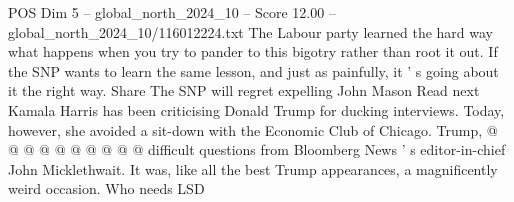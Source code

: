 \begin{textsample}{POS Dim 5 – global\_north\_2024\_10 – Score 12.00 – global\_north\_2024\_10/116012224.txt}
The Labour party learned the hard way what happens when you try to pander to this bigotry rather than root it out.
If the SNP wants to learn the same lesson, and just as painfully, it ' s going about it the right way.
Share The SNP will regret expelling John Mason Read next Kamala Harris has been criticising Donald Trump for ducking interviews.
Today, however, she avoided a sit-down with the Economic Club of Chicago.
Trump, @ @ @ @ @ @ @ @ @ @ difficult questions from Bloomberg News ' s editor-in-chief John Micklethwait.
It was, like all the best Trump appearances, a magnificently weird occasion.
Who needs LSD

\end{textsample}
